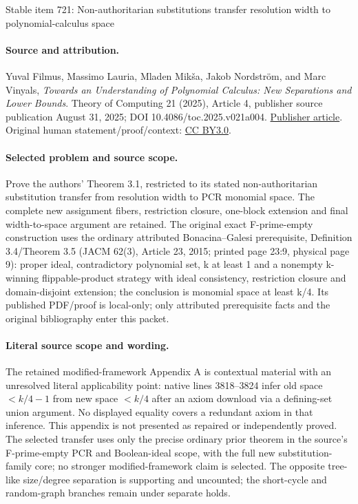 \documentclass[11pt]{article}
\numberwithin{equation}{section}
\theoremstyle{definition}
\theoremstyle{plain}
\theoremstyle{plain}
\theoremstyle{definition}
\begin{document}
\begin{center}{\Large Stable item 721: Non-authoritarian substitutions transfer resolution width to polynomial-calculus space}\end{center}
\paragraph{Source and attribution.}
Yuval Filmus, Massimo Lauria, Mladen Mikša, Jakob Nordström, and Marc Vinyals, \emph{Towards an Understanding of Polynomial Calculus: New Separations and Lower Bounds}. Theory of Computing 21 (2025), Article 4, publisher source publication August 31, 2025; DOI 10.4086/toc.2025.v021a004. \href{https://theoryofcomputing.org/articles/v021a004/}{Publisher article}. Original human statement/proof/context: \href{https://creativecommons.org/licenses/by/3.0/}{CC BY3.0}.
\paragraph{Selected problem and source scope.}
Prove the authors' Theorem 3.1, restricted to its stated non-authoritarian substitution transfer from resolution width to PCR monomial space. The complete new assignment fibers, restriction closure, one-block extension and final width-to-space argument are retained. The original exact F-prime-empty construction uses the ordinary attributed Bonacina–Galesi prerequisite, Definition 3.4/Theorem 3.5 (JACM 62(3), Article 23, 2015; printed page 23:9, physical page 9): proper ideal, contradictory polynomial set, k at least 1 and a nonempty k-winning flippable-product strategy with ideal consistency, restriction closure and domain-disjoint extension; the conclusion is monomial space at least k/4. Its published PDF/proof is local-only; only attributed prerequisite facts and the original bibliography enter this packet.
\paragraph{Literal source scope and wording.}
The retained modified-framework Appendix A is contextual material with an unresolved literal applicability point: native lines 3818–3824 infer old space \(<k/4-1\) from new space \(<k/4\) after an axiom download via a defining-set union argument. No displayed equality covers a redundant axiom in that inference. This appendix is not presented as repaired or independently proved. The selected transfer uses only the precise ordinary prior theorem in the source's F-prime-empty PCR and Boolean-ideal scope, with the full new substitution-family core; no stronger modified-framework claim is selected. The opposite tree-like size/degree separation is supporting and uncounted; the short-cycle and random-graph branches remain under separate holds.
\end{document}
